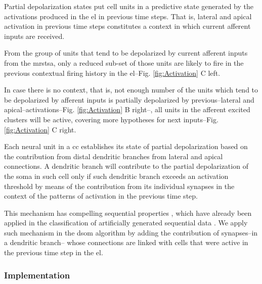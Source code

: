 \documentclass[10pt,letterpaper]{article}
\begin{document}
\pagebreak

Partial depolarization states put cell units in a predictive state generated by
the activations produced in the \gls{el} in previous time steps.
That is, lateral and apical activation in previous time steps constitutes a context in which
current afferent inputs are received.

From the group of units that tend to be depolarized by current afferent inputs from the \gls{mrstsa},
only a reduced sub-set of those units are likely to fire in the previous contextual firing history
in the \gls{el}--Fig. \ref{fig:Activation} C left.

In case there is no context, that is, not enough number of the units which tend to be depolarized by afferent inputs
is partially depolarized by previous--lateral and apical--activations--Fig. \ref{fig:Activation} B right--,
all units in the afferent excited clusters will be active, covering more hypotheses for next inputs--Fig. \ref{fig:Activation} C right.

Each neural unit in a \gls{cc} establishes its state of partial depolarization based on the contribution from
distal dendritic branches from lateral and apical connections.
A dendritic branch will contribute to the partial depolarization of the soma in such cell only if such
dendritic branch exceeds an activation threshold by means of the contribution from its individual synapses
in the context of the patterns of activation in the previous time step.

This mechanism has compelling sequential properties \cite{hawkins_2016},
which have already been applied in the classification of artificially generated sequential data \cite{cui_2016}.
We apply such mechanism in the \gls{dsom} algorithm by adding the contribution of synapses--in a dendritic branch--
whose connections are linked with cells that were active in the previous time step in the \gls{el}.
















\subsubsection*{Implementation}
\label{model-implementation}


~\\
~\\
~\\
\end{document}
